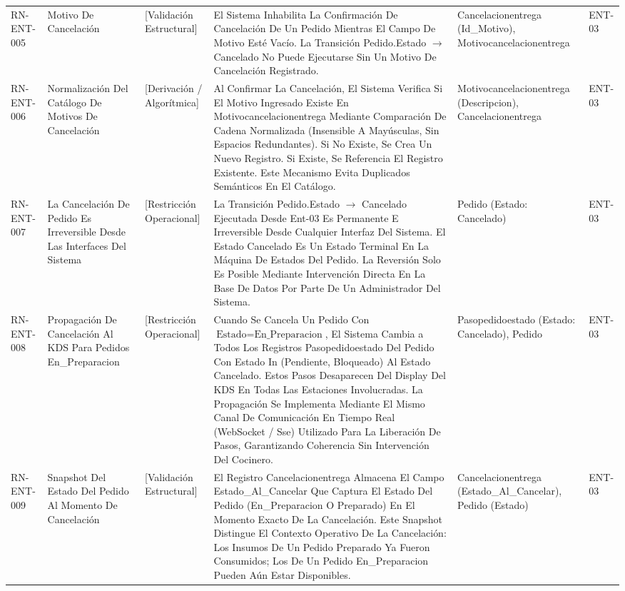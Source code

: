 \begin{landscape}
\begin{longtable}[c]{l p{2.1cm} p{2.1cm} p{8cm} p{4cm} p{3cm}}
RN-ENT-005 & Motivo De Cancelación & [Validación Estructural] & El Sistema Inhabilita La Confirmación De Cancelación De Un Pedido Mientras El Campo De Motivo Esté Vacío. La Transición Pedido.Estado $\rightarrow$ Cancelado No Puede Ejecutarse Sin Un Motivo De Cancelación Registrado. & Cancelacionentrega (Id\_Motivo), Motivocancelacionentrega & ENT-03 \\
\addlinespace
RN-ENT-006 & Normalización Del Catálogo De Motivos De Cancelación & [Derivación / Algorítmica] & Al Confirmar La Cancelación, El Sistema Verifica Si El Motivo Ingresado Existe En Motivocancelacionentrega Mediante Comparación De Cadena Normalizada (Insensible A Mayúsculas, Sin Espacios Redundantes). Si No Existe, Se Crea Un Nuevo Registro. Si Existe, Se Referencia El Registro Existente. Este Mecanismo Evita Duplicados Semánticos En El Catálogo. & Motivocancelacionentrega (Descripcion), Cancelacionentrega & ENT-03 \\
\addlinespace
RN-ENT-007 & La Cancelación De Pedido Es Irreversible Desde Las Interfaces Del Sistema & [Restricción Operacional] & La Transición Pedido.Estado $\rightarrow$ Cancelado Ejecutada Desde Ent-03 Es Permanente E Irreversible Desde Cualquier Interfaz Del Sistema. El Estado Cancelado Es Un Estado Terminal En La Máquina De Estados Del Pedido. La Reversión Solo Es Posible Mediante Intervención Directa En La Base De Datos Por Parte De Un Administrador Del Sistema. & Pedido (Estado: Cancelado) & ENT-03 \\
\addlinespace
RN-ENT-008 & Propagación De Cancelación Al KDS Para Pedidos En\_Preparacion & [Restricción Operacional] & Cuando Se Cancela Un Pedido Con $\text{Estado} = \text{En\_Preparacion}$, El Sistema Cambia a Todos Los Registros Pasopedidoestado Del Pedido Con Estado In (Pendiente, Bloqueado) Al Estado Cancelado. Estos Pasos Desaparecen Del Display Del KDS En Todas Las Estaciones Involucradas. La Propagación Se Implementa Mediante El Mismo Canal De Comunicación En Tiempo Real (WebSocket / Sse) Utilizado Para La Liberación De Pasos, Garantizando Coherencia Sin Intervención Del Cocinero. & Pasopedidoestado (Estado: Cancelado), Pedido & ENT-03 \\
\addlinespace
RN-ENT-009 & Snapshot Del Estado Del Pedido Al Momento De Cancelación & [Validación Estructural] & El Registro Cancelacionentrega Almacena El Campo Estado\_Al\_Cancelar Que Captura El Estado Del Pedido (En\_Preparacion O Preparado) En El Momento Exacto De La Cancelación. Este Snapshot Distingue El Contexto Operativo De La Cancelación: Los Insumos De Un Pedido Preparado Ya Fueron Consumidos; Los De Un Pedido En\_Preparacion Pueden Aún Estar Disponibles. & Cancelacionentrega (Estado\_Al\_Cancelar), Pedido (Estado) & ENT-03 \\
\end{longtable}
\endgroup


\end{landscape}
